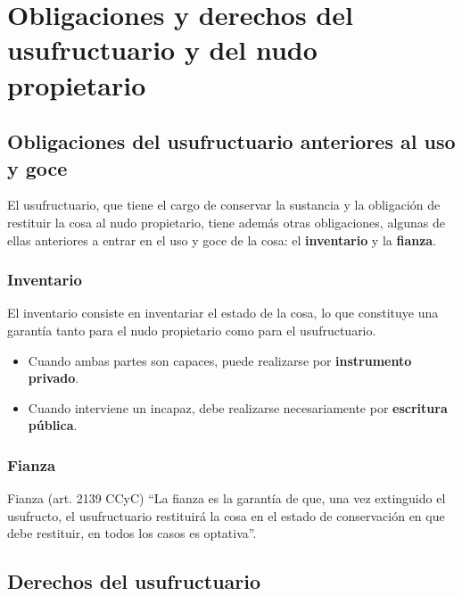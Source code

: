 \documentclass[12pt,oneside]{book}
\begin{document}
\chapter[Obligaciones y derechos de las partes]{Obligaciones y derechos del usufructuario y del nudo propietario}

\section{Obligaciones del usufructuario anteriores al uso y goce}

El usufructuario, que tiene el cargo de conservar la sustancia y la obligación de restituir la cosa al nudo propietario, tiene además otras obligaciones, algunas de ellas anteriores a entrar en el uso y goce de la cosa: el \textbf{inventario} y la \textbf{fianza}.

\subsection{Inventario}

El inventario consiste en inventariar el estado de la cosa, lo que constituye una garantía tanto para el nudo propietario como para el usufructuario.

\begin{itemize}
    \item Cuando ambas partes son capaces, puede realizarse por \textbf{instrumento privado}.
    \item Cuando interviene un incapaz, debe realizarse necesariamente por \textbf{escritura pública}.
\end{itemize}

\subsection{Fianza}

\begin{definition}{Fianza (art. 2139 CCyC)}
``La fianza es la garantía de que, una vez extinguido el usufructo, el usufructuario restituirá la cosa en el estado de conservación en que debe restituir, en todos los casos es optativa''.
\end{definition}

\section{Derechos del usufructuario}
\end{document}

